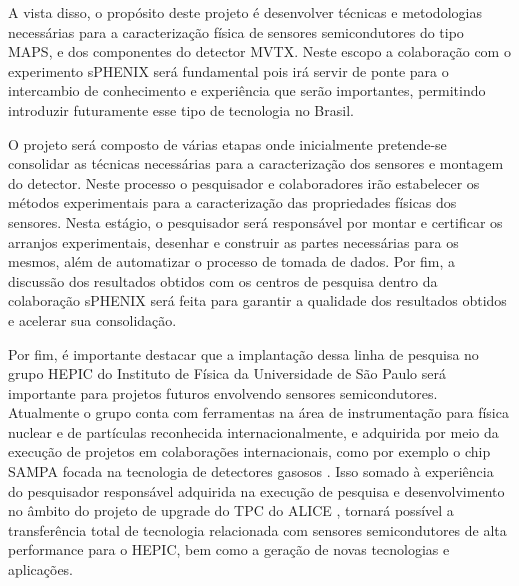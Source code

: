 A vista disso, o propósito deste projeto é desenvolver técnicas e metodologias necessárias para a caracterização física de sensores semicondutores do tipo MAPS, e dos componentes do detector MVTX. Neste escopo a colaboração com o experimento sPHENIX será fundamental pois irá servir de ponte para o intercambio de conhecimento e experiência que serão importantes, permitindo introduzir futuramente esse tipo de tecnologia no Brasil.

O projeto será composto de várias etapas onde inicialmente pretende-se consolidar as técnicas necessárias para a caracterização dos sensores e montagem do detector. Neste processo o pesquisador e colaboradores irão estabelecer os 
métodos experimentais para a caracterização das propriedades físicas dos sensores. Nesta estágio, o pesquisador será responsável por montar e certificar os arranjos experimentais, desenhar e construir as partes necessárias para os mesmos, além de automatizar o processo de tomada de dados. Por fim, a discussão dos resultados obtidos com os centros de pesquisa dentro da colaboração sPHENIX será feita para garantir a qualidade dos resultados obtidos e acelerar sua consolidação.

Por fim, é importante destacar que a implantação dessa linha de pesquisa no grupo HEPIC do Instituto de Física da Universidade de São Paulo será importante para projetos futuros envolvendo sensores semicondutores. Atualmente o grupo conta com ferramentas na área de instrumentação para física nuclear e de partículas reconhecida internacionalmente, e adquirida por meio da execução de projetos em colaborações internacionais, como por exemplo o chip SAMPA focada na tecnologia de detectores gasosos \cite{ref1}. Isso somado à experiência do pesquisador responsável adquirida na execução de pesquisa e desenvolvimento no âmbito do projeto de upgrade do TPC do ALICE \cite{tpcNIM,discharge_paper,GSI_REPO}, tornará possível a transferência total de tecnologia relacionada com sensores semicondutores de alta performance para o HEPIC, bem como a geração de novas tecnologias e aplicações.

\renewcommand{\cleardoublepage}{}
\renewcommand{\clearpage}{}